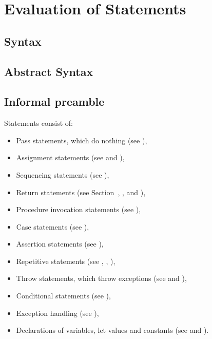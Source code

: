 \documentclass{book}
\begin{document}
\chapter{Evaluation of Statements \label{chap:eval_stmt}}

\section{Syntax}

\section{Abstract Syntax}


\section{Informal preamble}
Statements consist of:
\begin{itemize}
\item Pass statements, which do nothing (see ),
\item Assignment statements (see  and ),
\item Sequencing statements (see ),
\item Return statements (see Section~\label{sec:ReturnStatements}, ,  and ),
\item Procedure invocation statements (see ),
\item Case statements (see ),
\item Assertion statements (see ),
\item Repetitive statements (see , , ),
\item Throw statements, which throw exceptions (see  and ),
\item Conditional statements (see ),
\item Exception handling (see ),
\item Declarations of variables, let values and constants (see  and ).
\end{itemize}
\end{document}
